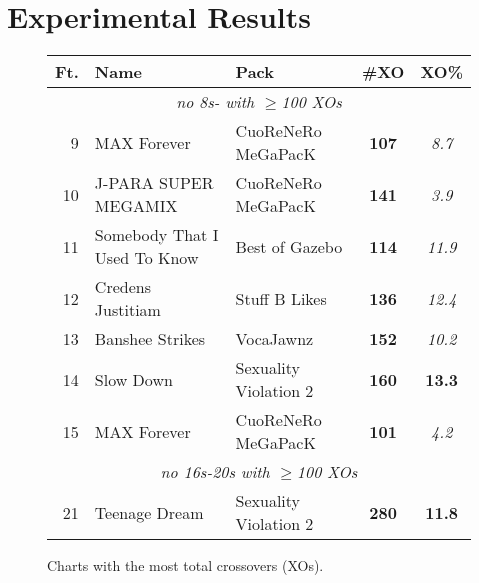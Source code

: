 \documentclass[10pt]{sigplanconf}
\begin{document}
\section{Experimental Results}


\begin{figure}[t]
	\begin{center}
		\small
	\begin{tabular}{r|l|l|c|c}
		\bf Ft. & \bf Name & \bf Pack & \bf \#XO & \bf XO\% \\
		\hline
		\multicolumn{5}{c}{\em no 8s- with $\ge$100 XOs} \\
		 9 & MAX Forever              & CuoReNeRo MeGaPacK    & \bf 107 & \em 8.7 \\
		10 & J-PARA SUPER MEGAMIX     & CuoReNeRo MeGaPacK    & \bf 141 & \em 3.9 \\
		11 & Somebody That I Used To Know & Best of Gazebo    & \bf 114 & \em 11.9 \\
		12 & Credens Justitiam        & Stuff B Likes         & \bf 136 & \em 12.4 \\
		13 & Banshee Strikes          & VocaJawnz             & \bf 152 & \em 10.2 \\
		14 & Slow Down                & Sexuality Violation 2 & \bf 160 & \bf 13.3 \\
		15 & MAX Forever              & CuoReNeRo MeGaPacK    & \bf 101 & \em 4.2 \\
		\multicolumn{5}{c}{\em no 16s-20s with $\ge$100 XOs} \\
		21 & Teenage Dream            & Sexuality Violation 2 & \bf 280 & \bf 11.8 \\
	\end{tabular}
	\end{center}
	\caption{Charts with the most total crossovers (XOs).}
\end{figure}
\end{document}

